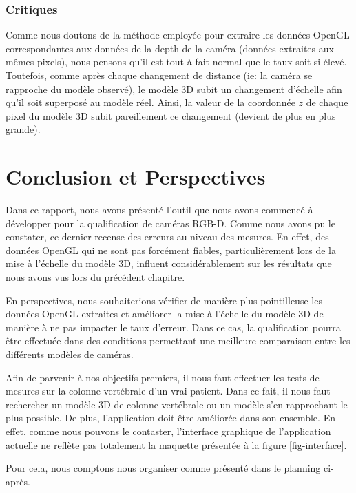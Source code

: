 \documentclass[a4paper, 12pt]{book}
\begin{document}
\subsection{Critiques}
Comme nous doutons de la méthode employée pour extraire les données OpenGL correspondantes aux données de la depth de la caméra (données extraites aux mêmes pixels), nous pensons qu'il est tout à fait normal que le taux soit si élevé. Toutefois, comme après chaque changement de distance (ie: la caméra se rapproche du modèle observé), le modèle 3D subit un changement d'échelle afin qu'il soit superposé au modèle réel. Ainsi, la valeur de la coordonnée $z$ de chaque pixel du modèle 3D subit pareillement ce changement (devient de plus en plus grande).



\chapter{Conclusion et Perspectives\label{chap-conclusion}}
\par Dans ce rapport, nous avons présenté l'outil que nous avons commencé à développer pour la qualification de caméras RGB-D. Comme nous avons pu le constater, ce dernier recense des erreurs au niveau des mesures. En effet, des données OpenGL qui ne sont pas forcément fiables, particulièrement lors de la mise à l'échelle du modèle 3D, influent considérablement sur les résultats que nous avons vus lors du précédent chapitre.
\par En perspectives, nous souhaiterions vérifier de manière plus pointilleuse les données OpenGL extraites et améliorer la mise à l'échelle du modèle 3D de manière à ne pas impacter le taux d'erreur.
Dans ce cas, la qualification pourra être effectuée dans des conditions permettant une meilleure comparaison entre les différents modèles de caméras.  
\par Afin de parvenir à nos objectifs premiers, il nous faut effectuer les tests de mesures sur la colonne vertébrale d'un vrai patient. Dans ce fait, il nous faut rechercher un modèle 3D de colonne vertébrale ou un modèle s'en rapprochant le plus possible. De plus, l'application doit être améliorée dans son ensemble. En effet, comme nous pouvons le contaster, l'interface graphique de l'application actuelle ne reflète pas totalement la maquette présentée à la figure \ref{fig-interface}.
\par Pour cela, nous comptons nous organiser comme présenté dans le planning ci-après.
\end{document}
